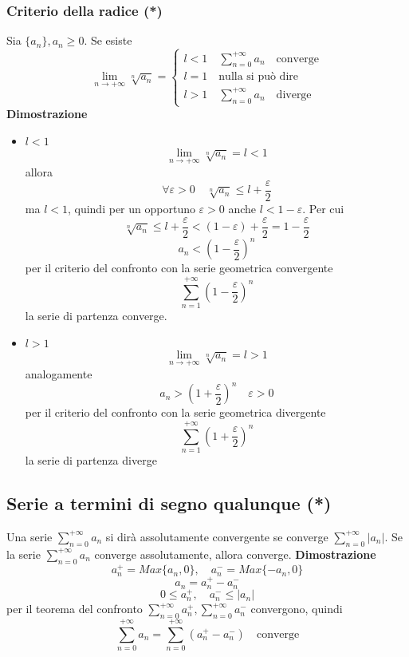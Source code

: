 \documentclass[12pt]{article}
\begin{document}
\subsubsection{Criterio della radice (*)}
Sia \(\{ a_n \}, a_n \geq 0\). Se esiste
\[
\lim_{n \to +\infty} \sqrt[n]{a_n} = \begin{cases}
l<1 \quad \sum_{n=0}^{+\infty} a_n \quad \text{converge}\\
l=1 \quad \text{nulla si può dire}\\
l>1 \quad \sum_{n=0}^{+\infty} a_n \quad \text{diverge}
\end{cases}
\]
\textbf{Dimostrazione}
\begin{itemize}
  \item $l<1$
  \[
  \lim_{n \to +\infty} \sqrt[n]{a_n} = l < 1
  \]
  allora 
  \[
  \forall \varepsilon > 0 \quad \sqrt[n]{a_n} \leq l + \frac{\varepsilon}{2}
  \]
  ma $l<1$, quindi per un opportuno $\varepsilon > 0$ anche $l< 1 - \varepsilon$. Per cui
  \[
  \sqrt[n]{a_n} \leq l + \frac{\varepsilon}{2} < (1-\varepsilon)+\frac{\varepsilon}{2} = 1 - \frac{\varepsilon}{2}
  \]
  \[
  a_n < \left(1 - \frac{\varepsilon}{2} \right)^n
  \] 
  per il criterio del confronto con la serie geometrica convergente 
  \[
  \sum_{n=1}^{+\infty} \left(1 - \frac{\varepsilon}{2} \right)^n
  \]
  la serie di partenza converge.
  \item $l>1$
  \[
  \lim_{n \to +\infty} \sqrt[n]{a_n} = l > 1
  \]
  analogamente
  \[
  a_n > \left(1 + \frac{\varepsilon}{2} \right)^n \quad \varepsilon>0
  \]
  per il criterio del confronto con la serie geometrica divergente
  \[
  \sum_{n=1}^{+\infty} \left(1 + \frac{\varepsilon}{2} \right)^n
  \]
  la serie di partenza diverge
\end{itemize}

\subsection{Serie a termini di segno qualunque (*)}
Una serie \(\displaystyle \sum_{n=0}^{+\infty} a_n\) si dirà assolutamente convergente se converge \(\displaystyle \sum_{n=0}^{+\infty} |a_n|\). \newline
Se la serie \(\displaystyle \sum_{n=0}^{+\infty} a_n\) converge assolutamente, allora converge. \newline
\textbf{Dimostrazione}
\[
a_n^+ = Max\{ a_n, 0 \}, \quad a_n^- = Max\{ -a_n, 0 \}
\]
\[
a_n = a_n^+ - a_n^-
\]
\[
0\leq a_n^+, \quad a_n^- \leq |a_n|
\]
per il teorema del confronto \(\displaystyle \sum_{n=0}^{+\infty} a_n^+ , \sum_{n=0}^{+\infty} a_n^-\) convergono, quindi
\[
\sum_{n=0}^{+\infty} a_n = \sum_{n=0}^{+\infty} (a_n^+ -a_n^-) \quad \text{converge}
\]
\end{document}
